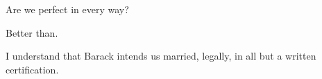  

Are we perfect in every way?

Better than.  

I understand that Barack intends us married, \break legally, in all
but a written certification.

\bye
